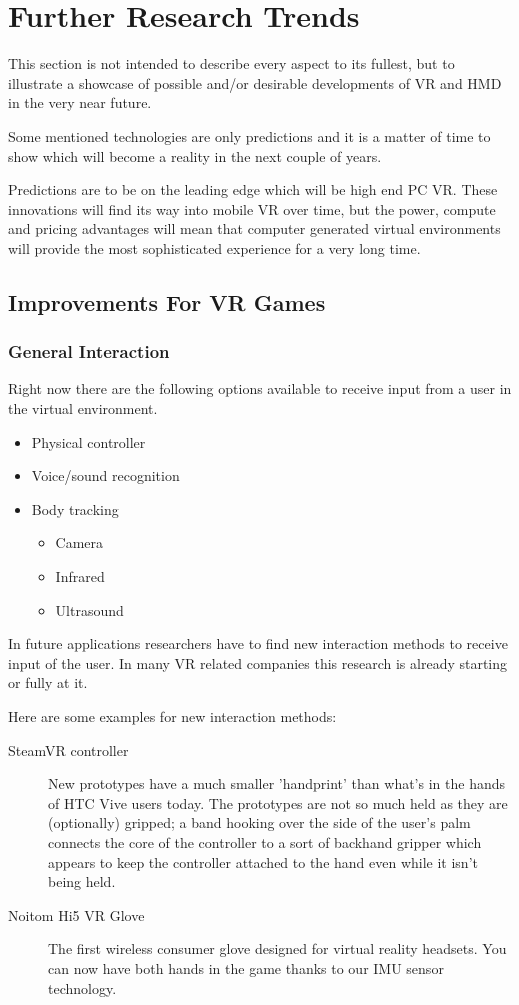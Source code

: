 \section{Further Research Trends}

This section is not intended to describe every aspect to its fullest, but to illustrate a showcase of possible and/or desirable developments of VR and HMD in the very near future. 

Some mentioned technologies are only predictions and it is a matter of time to show which will become a reality in the next couple of years.

Predictions are to be on the leading edge which will be high end PC VR. These innovations will find its way into mobile VR over time, but the power, compute and pricing advantages will mean that computer generated virtual environments will provide the most sophisticated experience for a very long time.

\subsection{Improvements For VR Games}
\subsubsection{General Interaction}

Right now there are the following options available to receive input from a user in the virtual environment.
\begin{itemize}
	\item Physical controller
	\item Voice/sound recognition
	\item Body tracking
	\begin{itemize}
		\item Camera
		\item Infrared
		\item Ultrasound
	\end{itemize}
\end{itemize}

In future applications researchers have to find new interaction methods to receive input of the user. In many VR related companies this research is already starting or fully at it. 

Here are some examples for new interaction methods:

\begin{description}
	\item[SteamVR controller] New prototypes have a much smaller 'handprint' than what's in the hands of HTC Vive users today. The prototypes are not so much held as they are (optionally) gripped; a band hooking over the side of the user’s palm connects the core of the controller to a sort of backhand gripper which appears to keep the controller attached to the hand even while it isn’t being held.
	\item[Noitom Hi5 VR Glove~\textcopyright] The first wireless consumer glove designed for virtual reality headsets. You can now have both hands in the game thanks to our IMU sensor technology. 
\end{description}

